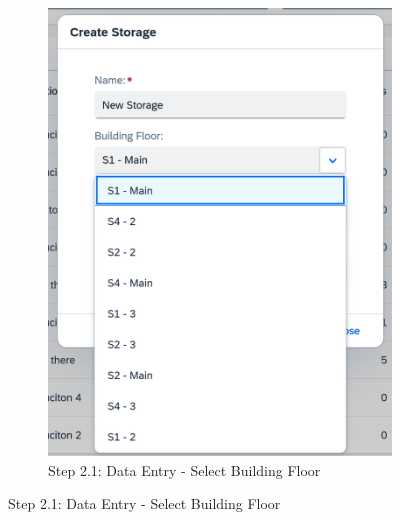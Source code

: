 \begin{figure}[!htb]
\begin{subfigure}{0.4\linewidth}
        \includegraphics[width=\linewidth]{images/user_doc/storage/StorageReportPage/csdlgDropDown.png}
        \caption{Step 2.1: Data Entry - Select Building Floor}
    \end{subfigure}


\end{figure}
